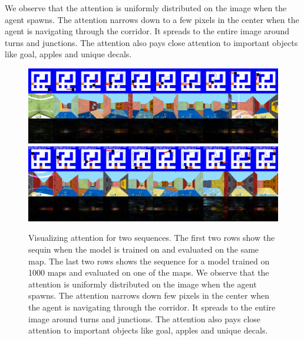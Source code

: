 We observe that the attention is uniformly distributed on the image when the agent spawns. The attention narrows down to a few pixels in the center when the agent is navigating through the corridor. It spreads to the entire image around turns and junctions. The attention also pays close attention to important objects like goal, apples and unique decals.

\begin{figure}
\includegraphics[width=\textwidth,trim=0 0 0 336pt,clip]{./exp-results/training-09x09-0127-on-0127.png}\vspace{1ex}\\
%
\includegraphics[width=\textwidth,trim=0 0 0 336pt,clip]{./exp-results/training-1000-on-0127.png}%
\caption{Visualizing attention for two sequences. The first two rows show the sequin when the model is trained on and evaluated on the same map. The last two rows shows the sequence for a model trained on 1000 maps and evaluated on one of the maps. We observe that the attention is uniformly distributed on the image when the agent spawns. The attention narrows down few pixels in the center when the agent is navigating through the corridor. It spreads to the entire image around turns and junctions. The attention also pays close attention to important objects like goal, apples and unique decals.}
\label{fig:attention}
\end{figure}


%



